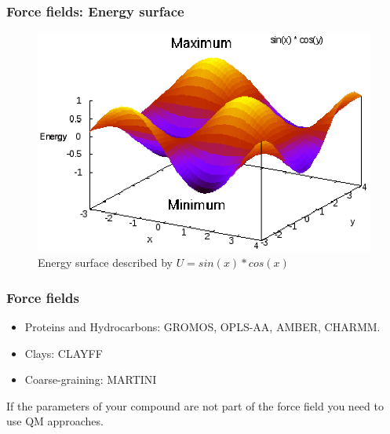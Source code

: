 \documentclass{beamer}
\begin{document}
\begin{frame}\frametitle{Force fields: Energy surface}

\begin{figure}
\includegraphics[scale=0.681]{surface.eps}
\caption{{\scriptsize Energy surface described by $U=sin(x)*cos(x)$}}
\end{figure}

\end{frame}

\begin{frame}\frametitle{Force fields}

\begin{itemize}
\item Proteins and Hydrocarbons: GROMOS, OPLS-AA, AMBER, CHARMM.
\item Clays: CLAYFF
\item Coarse-graining: MARTINI
\end{itemize}

If the parameters of your compound are not part of the force field you need to use QM approaches.

\end{frame}
\end{document}
